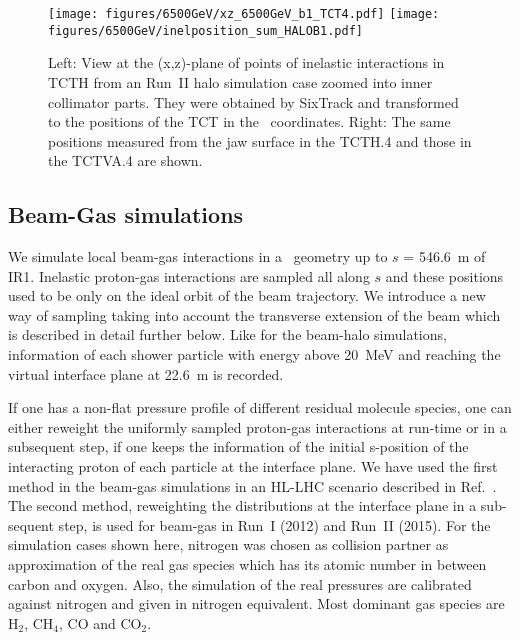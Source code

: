 \begin{figure}%
\begin{center}
  \texttt{[image: figures/6500GeV/xz\_6500GeV\_b1\_TCT4.pdf]}
  \texttt{[image: figures/6500GeV/inelposition\_sum\_HALOB1.pdf]}
\end{center}
\vspace{-0.6cm}
 \caption{Left: View at the (x,z)-plane of points of inelastic interactions in TCTH from an Run~II halo simulation case zoomed into inner collimator parts. They were obtained by SixTrack and transformed to the positions of the TCT in the \fluka~coordinates. Right: The same positions measured from the jaw surface in the TCTH.4 and those in the TCTVA.4 are shown.
  \label{tctHits}}
\end{figure}


\subsection{Beam-Gas simulations \label{BGdescript}}

We simulate local beam-gas interactions in a \fluka~geometry up to $s$ = 546.6~m of IR1. Inelastic proton-gas interactions are sampled all along $s$ and these positions used to be only on the ideal orbit of the beam trajectory. We introduce a new way of sampling taking into account the transverse extension of the beam which is described in detail further below.
Like for the beam-halo simulations, information of each shower particle with energy above 20~MeV and reaching the virtual interface plane at 22.6~m is recorded.

If one has a non-flat pressure profile of different residual molecule species, one can either reweight the uniformly sampled proton-gas interactions at run-time or in a subsequent step, if one keeps the information of the initial s-position of the interacting proton of each particle at the interface plane. We have used the first method in the beam-gas simulations in an HL-LHC scenario described in Ref.~\cite{kweeIpac14}. The second method, reweighting the distributions at the interface plane in a sub-sequent step, is used for beam-gas in Run~I (2012) and Run~II (2015). For the simulation cases shown here, nitrogen was chosen as collision partner as approximation of the real gas species which has its atomic number in between carbon and oxygen. Also, the simulation of the real pressures are calibrated against nitrogen and given in nitrogen equivalent. Most dominant gas species are H$_2$, CH$_4$, CO and CO$_2$.

